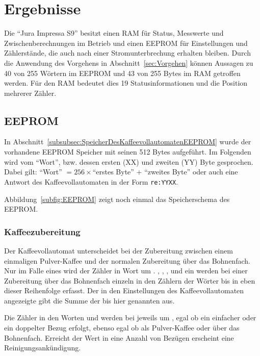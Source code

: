 \chapter{Ergebnisse}\label{ch:Ergebnisse} %
Die "`Jura Impressa S9"' besitzt einen \ac{RAM} für Status, Messwerte und Zwischenberechnungen im Betrieb und einen \ac{EEPROM} für Einstellungen und Zählerstände, die auch nach einer Stromunterbrechung erhalten bleiben.
Durch die Anwendung des Vorgehens in Abschnitt~\ref{sec:Vorgehen} können Aussagen zu 40 von 255 Wörtern im \ac{EEPROM} und 43 von 255 Bytes im \ac{RAM} getroffen werden.
Für den \ac{RAM} bedeutet dies 19 Statusinformationen und die Position mehrerer Zähler.

\section{EEPROM}
In Abschnitt~\ref{subsubsec:SpeicherDesKaffeevollautomatenEEPROM} wurde der vorhandene \acf{EEPROM} Speicher mit seinen 512 Bytes aufgeführt.
Im Folgenden wird vom "`Wort"', bzw. dessen ersten (XX) und zweiten (YY) Byte gesprochen.
Dabei gilt: "`Wort"' $= 256\times$"`erstes Byte"' $ + $ "`zweites Byte"' oder auch eine Antwort des Kaffeevollautomaten in der Form \texttt{re:YYXX}.

Abbildung~\ref{subfig:EEPROM} zeigt noch einmal das Speicherschema des \ac{EEPROM}.

\subsection{Kaffeezubereitung}\label{subsec:ErgebnisKaffeezubereitung}
Der Kaffeevollautomat unterscheidet bei der Zubereitung zwischen einem einmaligen Pulver-Kaffee und der normalen Zubereitung über das Bohnenfach.
Nur im Falle eines  wird der Zähler in Wort  um .
, , ,  und ein  werden bei einer Zubereitung über das Bohnenfach einzeln in den Zählern der Wörter  bis  in eben dieser Reihenfolge erfasst.
Der in den Einstellungen des Kaffeevollautomaten angezeigte  gibt die Summe der bis hier genannten  aus.

Die Zähler in den Worten  und  werden bei  jeweils um , egal ob ein einfacher oder ein doppelter Bezug erfolgt, ebenso egal ob als Pulver-Kaffee oder über das Bohnenfach.
Erreicht der Wert in  eine Anzahl von  Bezügen erscheint eine Reinigungsankündigung.

